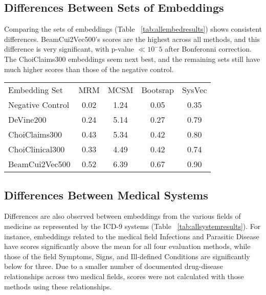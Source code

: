 \documentclass[11pt,a4paper]{article}
\begin{document}
\subsection{Differences Between Sets of Embeddings}
Comparing the sets of embeddings (Table ~\ref{tab:allembedresults}) shows consistent differences. BeamCui2Vec500's scores are the highest across all methods, and this difference is very significant, with p-value $\ll 10^-5$ after Bonferonni correction. The ChoiClaims300 embeddings seem next best, and the remaining sets still have much higher scores than those of the negative control. 


\begin{table*}[h]
	\begin{center}
		\begin{tabular}{lcccc}
			Embedding Set &MRM 	        &MCSM              &Bootsrap 	  &SysVec \\
			\hlineB{4}
			Negative Control& 0.02 & 1.24 & 0.05 & 0.35 \\
			\hline	            
			DeVine200       & 0.24 & 5.14 &	0.27 & 0.79 \\
			\hline
			ChoiClaims300   & 0.43 & 5.34 &	0.42 & 0.80 \\
			\hline 
			ChoiClinical300	& 0.33 & 4.49 &	0.42 & 0.74 \\
			\hline
			BeamCui2Vec500	& 0.52 & 6.39 & 0.67 & 0.90 \\
		\end{tabular}
		\caption{Mean scores for embedding sets for each evaluation method. See Methods section for abbreviations}
		\label{tab:allembedresults}
	\end{center}
	
\end{table*}


\subsection{Differences Between Medical Systems}

Differences are also observed between embeddings from the various fields of medicine as represented by the ICD-9 systems (Table ~\ref{tab:allsystemresults}). For instance, embeddings related to the medical field Infections and Parasitic Disease have scores significantly above the mean for all four evaluation methods, while those of the field Symptoms, Signs, and Ill-defined Conditions are significantly below for three. Due to a smaller number of documented drug-disease relationships across two medical fields, scores were not calculated with those methods using these relationships.  
\end{document}

